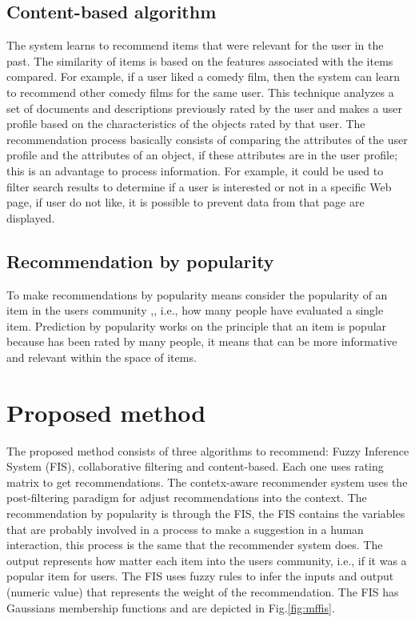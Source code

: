   \subsection{Content-based algorithm} \label{sec:2.3}

  The system learns to recommend items that were relevant for the user in the
  past. The similarity of items is based on the features associated with the items
  compared. For example, if a user liked a comedy film, then the system can learn
  to recommend other comedy films for the same user. This technique analyzes a set
  of documents and descriptions previously rated by the user and makes a user
  profile based on the characteristics of the objects rated by that user. The
  recommendation process basically consists of comparing the attributes of the
  user profile and the attributes of an object, if these attributes are in the
  user profile; this is an advantage to process information. For example, it could
  be used to filter search results to determine if a user is interested or not in
  a specific Web page, if user do not like, it is possible to prevent data from
  that page are displayed\cite{ricci2011introduction}.


  \subsection{Recommendation by popularity} \label{sec:2.4}

  To make recommendations by popularity means consider the popularity of an item
  in the users community \cite{shani2008mining},\cite{celma2008new}, i.e., how
  many people have evaluated a single item. Prediction by popularity works on
  the principle that an item is popular because has been rated by many people,
  it means that can be more informative and relevant within the space of items.


\section{Proposed method}\label{sec:3}


The proposed method consists of three algorithms to recommend: Fuzzy Inference
System (FIS), collaborative filtering and content-based.   Each one uses rating
matrix to get recommendations. The contetx-aware recommender system uses the
post-filtering paradigm \cite{adomavicius2011context} for adjust
recommendations into the context. The recommendation by popularity is through
the FIS, the FIS contains the variables that are probably involved in a process
to make a suggestion in a human interaction, this process is the same that the
recommender system does. The output represents how matter each item into the
users community, i.e., if it was a popular item for users. The FIS uses fuzzy
rules to infer the inputs  and output (numeric value) that represents the weight
of the recommendation. The FIS has Gaussians membership functions and are
depicted in Fig.\ref{fig:mffis}.


